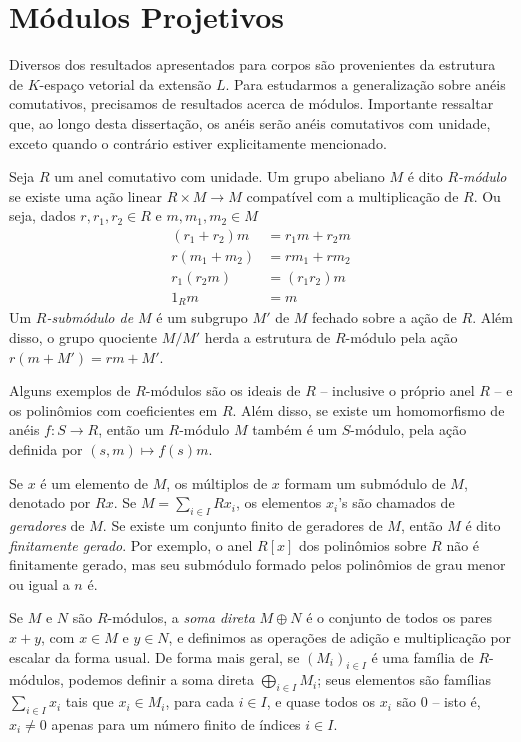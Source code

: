 \section{Módulos Projetivos}
Diversos dos resultados apresentados para corpos são provenientes da estrutura de $K$-espaço vetorial da extensão $L$. Para estudarmos a generalização sobre anéis comutativos, precisamos de resultados acerca de módulos.
Importante ressaltar que, ao longo desta dissertação, os anéis serão anéis comutativos com unidade, exceto quando o contrário estiver explicitamente mencionado.
\begin{defn}
Seja $R$ um anel comutativo com unidade. Um grupo abeliano $M$ é dito \emph{$R$-módulo} se existe uma ação linear $R \times M \rightarrow M$ compatível com a multiplicação de $R$. Ou seja, dados $r, r_1, r_2 \in R$ e $m, m_1, m_2 \in M$
\begin{align*}
    (r_1 + r_2) m &= r_1 m + r_2  m \\
    r  (m_1+m_2) &= r  m_1 + r  m_2 \\
    r_1  (r_2  m) &= (r_1  r_2)  m \\
    1_R  m &= m 
\end{align*}
Um \emph{$R$-submódulo de $M$} é um subgrupo $M'$ de $M$ fechado sobre a ação de $R$. Além disso, o grupo quociente $M/M'$ herda a estrutura de $R$-módulo pela ação $r (m + M') = r m + M'$.
\end{defn}
Alguns exemplos de $R$-módulos são os ideais de $R$ -- inclusive o próprio anel $R$ -- e os polinômios com coeficientes em $R$. Além disso, se existe um homomorfismo de anéis $f: S \rightarrow R$, então um $R$-módulo $M$ também é um $S$-módulo, pela ação definida por $(s, m)\mapsto f(s) m$. \par 
Se $x$ é um elemento de $M$, os múltiplos de $x$ formam um submódulo de $M$, denotado por $Rx$. Se $M=\sum_{i \in I}Rx_i$, os elementos $x_i$'s são chamados de \emph{geradores} de $M$. Se existe um conjunto finito de geradores de $M$, então $M$ é dito \emph{finitamente gerado}. Por exemplo, o anel $R[x]$ dos polinômios sobre $R$ não é finitamente gerado, mas seu submódulo formado pelos polinômios de grau menor ou igual a $n$ é. \par
Se $M$ e $N$ são $R$-módulos, a \emph{soma direta} $M\oplus N$ é o conjunto de todos os pares $x+y$, com $x \in M$ e $y\in N$, e definimos as operações de adição e multiplicação por escalar da forma usual. De forma mais geral, se $(M_i)_{i\in I}$ é uma família de $R$-módulos, podemos definir a soma direta $\bigoplus_{i \in I}M_i$; seus elementos são famílias $\sum_{i\in I}x_i$ tais que $x_i \in M_i$, para cada $i \in I$, e quase todos os $x_i$ são 0 -- isto é, $x_i \neq 0$ apenas para um número finito de índices $i \in I$. \par
